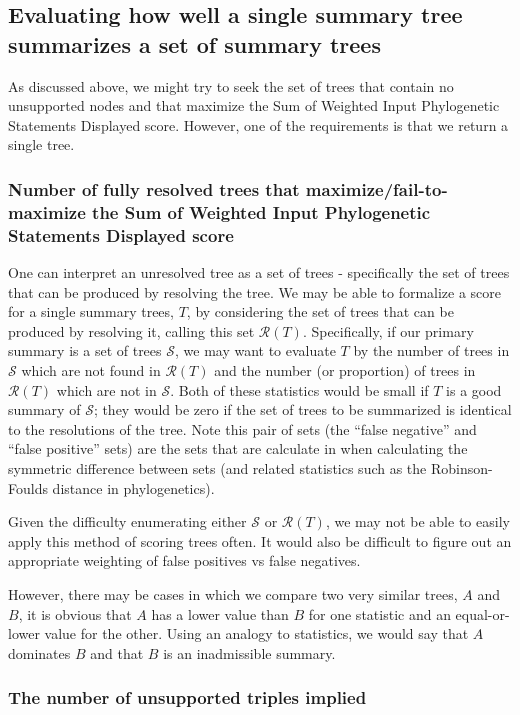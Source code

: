 \documentclass[11pt]{article}
\newcommand{\PSs}{Phylogenetic Statements\xspace}
\newcommand{\SWIPSD}{Sum of Weighted Input \PSs Displayed\xspace}
\begin{document}
\subsection{Evaluating how well a single summary tree summarizes a set of summary trees}\label{treeAdmissibility}
As discussed above, we might try to seek the set of trees that contain no unsupported nodes and that
    maximize the \SWIPSD score.
However, one of the requirements is that we return a single tree.

\subsubsection{Number of fully resolved trees that maximize/fail-to-maximize the \SWIPSD score}
One can interpret an unresolved tree as a set of trees - specifically the set of trees that 
    can be produced by resolving the tree.
We may be able to formalize a score for a single summary trees, $T$, by considering
    the set of trees that can be produced by resolving it, calling this set $\mathcal{R}(T)$.
Specifically, if our primary summary is a set of trees $\mathcal{S}$, we may want
    to evaluate $T$ by the number of trees in $\mathcal{S}$ which are not found
    in $\mathcal{R}(T)$ 
    and the number (or proportion) of trees in $\mathcal{R}(T)$ which
    are not in $\mathcal{S}$.
Both of these statistics would be small if $T$ is a good summary of $\mathcal{S}$; they 
    would be zero if the set of trees to be summarized is identical to the resolutions
    of the tree.
Note this pair of sets (the ``false negative'' and ``false positive'' sets) are the
    sets that are calculate in when calculating the symmetric difference between 
    sets (and related statistics such as the Robinson-Foulds distance in phylogenetics).

Given the difficulty enumerating either $\mathcal{S}$ or $\mathcal{R}(T)$, we may not be able to easily 
    apply this method of scoring trees often.
It would also be difficult to figure out an appropriate weighting of false positives vs false negatives.

However, there may be cases in which we compare two very similar trees, $A$ and $B$, it is obvious
    that $A$ has a lower value than $B$ for one statistic and an equal-or-lower value for the other.
Using an analogy to statistics, we would say that $A$ dominates $B$ and that $B$ is an inadmissible summary.

\subsubsection{The number of unsupported triples implied}
\end{document}

